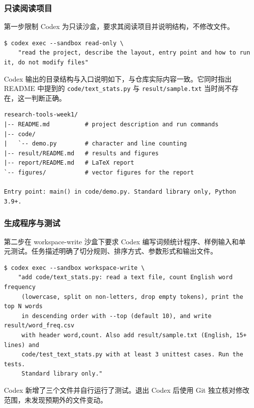 \documentclass{SYSUReport}
\begin{document}
\subsubsection{只读阅读项目}

第一步限制 Codex 为只读沙盒，要求其阅读项目并说明结构，不修改文件。

\begin{lstlisting}[style=shell, caption={要求 Codex 只读阅读项目}]
$ codex exec --sandbox read-only \
    "read the project, describe the layout, entry point and how to run it, do not modify files"
\end{lstlisting}

Codex 输出的目录结构与入口说明如下，与仓库实际内容一致。它同时指出 README 中提到的 \verb|code/text_stats.py| 与 \verb|result/sample.txt| 当时尚不存在，这一判断正确。

\begin{lstlisting}[caption={Codex 阅读结果}]
research-tools-week1/
|-- README.md          # project description and run commands
|-- code/
|   `-- demo.py        # character and line counting
|-- result/README.md   # results and figures
|-- report/README.md   # LaTeX report
`-- figures/           # vector figures for the report

Entry point: main() in code/demo.py. Standard library only, Python 3.9+.
\end{lstlisting}

\subsubsection{生成程序与测试}

第二步在 workspace-write 沙盒下要求 Codex 编写词频统计程序、样例输入和单元测试。任务描述明确了切分规则、排序方式、参数形式和输出文件。

\begin{lstlisting}[style=shell, caption={要求 Codex 完成编程任务}]
$ codex exec --sandbox workspace-write \
    "add code/text_stats.py: read a text file, count English word frequency
     (lowercase, split on non-letters, drop empty tokens), print the top N words
     in descending order with --top (default 10), and write result/word_freq.csv
     with header word,count. Also add result/sample.txt (English, 15+ lines) and
     code/test_text_stats.py with at least 3 unittest cases. Run the tests.
     Standard library only."
\end{lstlisting}

Codex 新增了三个文件并自行运行了测试。退出 Codex 后使用 Git 独立核对修改范围，未发现预期外的文件变动。
\end{document}
